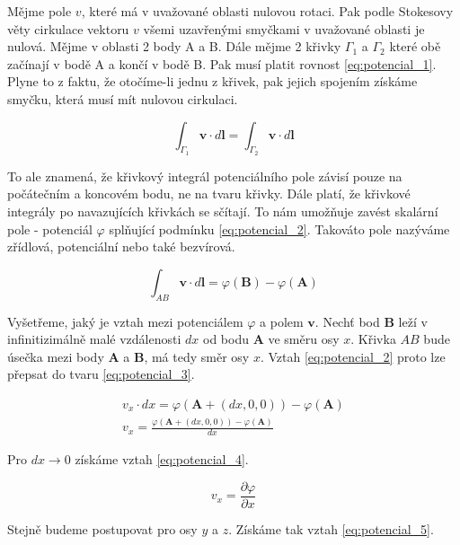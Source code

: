 \documentclass{book}
\newcommand{\vect}[1]{\boldsymbol{#1}}
\begin{document}
Mějme pole \(v\), které má v uvažované oblasti nulovou rotaci. Pak podle Stokesovy věty cirkulace vektoru \(v\) všemi uzavřenými smyčkami v uvažované
oblasti je nulová. Mějme v oblasti 2 body A a B. Dále mějme 2 křivky \(\Gamma_1\) a \(\Gamma_2\) které obě začínají v bodě A a končí v bodě B. Pak musí platit rovnost \eqref{eq:potencial_1}. Plyne to z faktu, že otočíme-li jednu z křivek, pak jejich spojením získáme smyčku, která musí mít nulovou cirkulaci.

\begin{equation}
\label{eq:potencial_1}
\int_{\Gamma_1} \vect{v} \cdot d\vect{l} = \int_{\Gamma_2} \vect{v} \cdot d\vect{l}
\end{equation}

To ale znamená, že křivkový integrál potenciálního pole závisí pouze na počátečním a koncovém bodu, ne na tvaru křivky. Dále platí, že křivkové integrály po navazujících křivkách se sčítají. To nám umožňuje zavést skalární pole - potenciál \(\varphi\) splňující podmínku \eqref{eq:potencial_2}. Takováto pole nazýváme zřídlová, potenciální nebo také bezvírová.

\begin{equation}
\label{eq:potencial_2}
\int_{AB} \vect{v} \cdot d\vect{l} = \varphi(\vect{B}) - \varphi(\vect{A})
\end{equation}

Vyšetřeme, jaký je vztah mezi potenciálem \(\varphi\) a polem \(\vect{v}\). Nechť bod \(\vect{B}\) leží v infinitizimálně malé vzdálenosti \(dx\) od bodu
\(\vect{A}\) ve směru osy \(x\). Křivka \(AB\) bude úsečka mezi body \(\vect{A}\) a \(\vect{B}\), má tedy směr osy \(x\). Vztah \eqref{eq:potencial_2} proto lze přepsat do tvaru \eqref{eq:potencial_3}.

\begin{equation}
\label{eq:potencial_3}
\begin{split}
v_x \cdot dx = \varphi(\vect{A} + (dx, 0, 0)) - \varphi(\vect{A}) \\
v_x = \frac{\varphi(\vect{A} + (dx, 0, 0)) - \varphi(\vect{A})}{dx}
\end{split}
\end{equation}

Pro \(dx \rightarrow 0\) získáme vztah \eqref{eq:potencial_4}.

\begin{equation}
\label{eq:potencial_4}
v_x = \frac{\partial \varphi}{\partial x}
\end{equation}

Stejně budeme postupovat pro osy \(y\) a \(z\). Získáme tak vztah \eqref{eq:potencial_5}.
\end{document}
